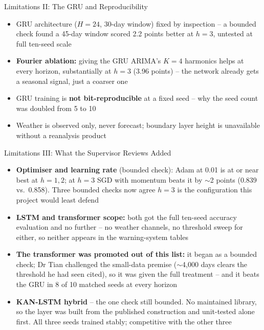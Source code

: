 \documentclass[12pt,aspectratio=169]{beamer}
\begin{document}
\begin{frame}{Limitations II: The GRU and Reproducibility}
  \begin{itemize}
    \item GRU architecture ($H=24$, 30-day window) fixed by inspection --
      a bounded check found a 45-day window scored 2.2 points better at
      $h=3$, untested at full ten-seed scale
    \item \textbf{Fourier ablation:} giving the GRU ARIMA's $K=4$
      harmonics helps at every horizon, substantially at $h=3$ (3.96
      points) -- the network already gets a seasonal signal, just a
      coarser one
    \item GRU training is \textbf{not bit-reproducible} at a fixed seed
      -- why the seed count was doubled from 5 to 10
    \item Weather is observed only, never forecast; boundary layer
      height is unavailable without a reanalysis product
  \end{itemize}
\end{frame}

\begin{frame}{Limitations III: What the Supervisor Reviews Added}
  \begin{itemize}
    \item \textbf{Optimiser and learning rate} (bounded check): Adam at
      0.01 is at or near best at $h=1,2$; at $h=3$ SGD with momentum
      beats it by $\sim$2 points (0.839 vs.\ 0.858). Three bounded checks
      now agree $h=3$ is the configuration this project would least
      defend
    \item \textbf{LSTM and transformer scope:} both got the full ten-seed
      accuracy evaluation and no further -- no weather channels, no
      threshold sweep for either, so neither appears in the
      warning-system tables
    \item \textbf{The transformer was promoted out of this list:} it
      began as a bounded check; Dr Tian challenged the small-data premise
      ($\sim$4{,}000 days clears the threshold he had seen cited), so it
      was given the full treatment -- and it beats the GRU in 8 of 10
      matched seeds at every horizon
    \item \textbf{KAN-LSTM hybrid} -- the one check still bounded. No
      maintained library, so the layer was built from the published
      construction and unit-tested alone first. All three seeds trained
      stably; competitive with the other three
  \end{itemize}
\end{frame}
\end{document}
